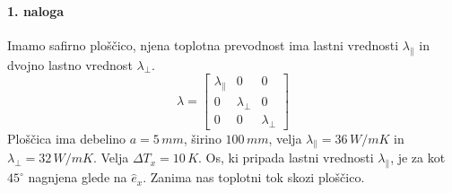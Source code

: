 \documentclass[a4paper]{article}
\begin{document}
\paragraph{1. naloga} Imamo safirno ploščico, njena toplotna prevodnost ima lastni vrednosti $\lambda_\parallel$ in dvojno lastno vrednost $\lambda_\perp$.
$$\lambda = \begin{bmatrix}
    \lambda_\parallel & 0 & 0 \\
    0 & \lambda_\perp & 0 \\
    0 & 0 & \lambda_\perp
\end{bmatrix}$$
Ploščica ima debelino $a = 5\,mm$, širino $100\,mm$, velja $\lambda_\parallel = 36\,W/mK$ in $\lambda_\perp = 32\,W/mK$. Velja $\Delta T_x = 10\,K$. Os, ki pripada lastni vrednosti $\lambda_\parallel$, je za kot $45^\circ$ nagnjena glede na $\hat{e}_x$. Zanima nas toplotni tok skozi ploščico.
\end{document}
